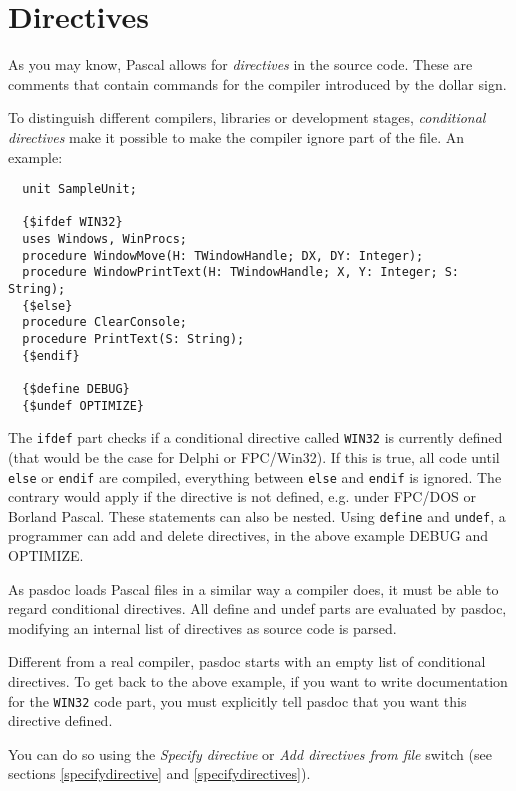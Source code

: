 \documentclass[11pt]{article}
\begin{document}
\section{Directives}

As you may know, Pascal allows for \emph{directives} in the source code.
These are comments that contain commands for the compiler introduced by the
dollar sign.

To distinguish different compilers, libraries or development stages,
\emph{conditional directives} make it possible to make the compiler ignore
part of the file.
An example:

\begin{verbatim}
  unit SampleUnit;

  {$ifdef WIN32}
  uses Windows, WinProcs;
  procedure WindowMove(H: TWindowHandle; DX, DY: Integer);
  procedure WindowPrintText(H: TWindowHandle; X, Y: Integer; S: String);
  {$else}
  procedure ClearConsole;
  procedure PrintText(S: String);
  {$endif}

  {$define DEBUG}
  {$undef OPTIMIZE}
\end{verbatim}

The {\tt ifdef} part checks if a conditional directive called {\tt WIN32} is
currently defined (that would be the case for Delphi or FPC/Win32).
If this is true, all code until {\tt else} or {\tt endif} are compiled,
everything between {\tt else} and {\tt endif} is ignored.
The contrary would apply if the directive is not defined, e.g. under FPC/DOS
or Borland Pascal.
These statements can also be nested.
Using {\tt define} and {\tt undef}, a programmer can add and delete
directives, in the above example DEBUG and OPTIMIZE.

As pasdoc loads Pascal files in a similar way a compiler does, it must be able
to regard conditional directives. All define and undef parts are evaluated by 
pasdoc, modifying an internal list of directives as source code is parsed.

Different from a real compiler, pasdoc starts with an empty list of
conditional directives. To get back to the above example, if you want to write 
documentation for the {\tt WIN32} code part, you must explicitly tell pasdoc 
that you want this directive defined.

You can do so using the \emph{Specify directive} or \emph{Add directives from
file} switch (see sections \ref{specifydirective} and \ref{specifydirectives}).
\end{document}
